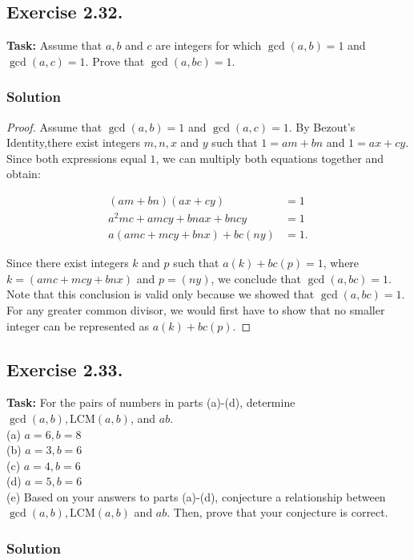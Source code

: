 \documentclass{article}
\begin{document}
\newpage

\subsection{Exercise 2.32.}
\textbf{Task:} Assume that $a,b$ and $c$ are integers for which \(\gcd(a, b) =1\) and  \\\(\gcd(a, c) =1\). Prove that  \(\gcd(a, bc) =1\).

\subsubsection*{Solution}

\begin{proof}
    Assume that $\gcd(a,b)=1$ and $\gcd(a,c)=1$. By Bezout's Identity,there exist integers $m,n,x$ and $y$ such that $1=am+bn$ and $1=ax+cy$. Since both expressions equal $1$, we can multiply both equations together and obtain:

    \begin{align*}
        (am+bn)(ax+cy)&=1 \\
        a^2mc+amcy+bnax+bncy&=1 \\
        a(amc+mcy+bnx)+bc(ny) &=1.
    \end{align*}

    Since there exist integers $k$ and $p$ such that $a(k)+bc(p)=1$, where $k=(amc+mcy+bnx)$ and $p=(ny)$, we conclude that $\gcd(a,bc)=1$. Note that this conclusion is valid only because we showed that $\gcd(a,bc)=1$. For any greater common divisor, we would first have to show that no smaller integer can be represented as $a(k)+bc(p)$.  
\end{proof}

\subsection{Exercise 2.33.}
\textbf{Task:} For the pairs of numbers in parts (a)-(d), determine $\gcd(a,b), \text{LCM}(a,b)$, and $ab$.\\
(a) $a=6, b = 8$\\
(b) $a=3, b = 6$\\
(c) $a=4, b = 6$\\
(d) $a=5, b = 6$\\
(e) Based on your answers to parts (a)-(d), conjecture a relationship between $\gcd(a,b), \text{LCM}(a,b)$ and $ab$. Then, prove that your conjecture is correct.

\subsubsection*{Solution}
\end{document}
